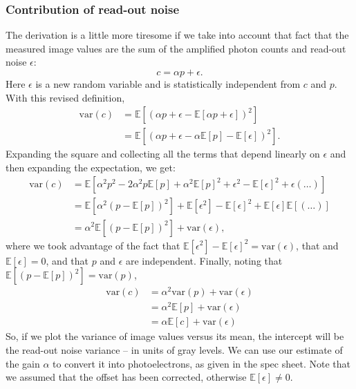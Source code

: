 \documentclass[a4paper]{report}
\begin{document}
\subsubsection{Contribution of read-out noise}
The derivation is a little more tiresome if we take into account that fact that the measured image values are the sum of the amplified photon counts and read-out noise $\epsilon$:
\begin{equation}
	c = \alpha p + \epsilon.
\end{equation}
Here $\epsilon$ is a new random variable and is statistically independent from $c$ and $p$. With this revised definition, 
\begin{align}
	\mathrm{var}(c) & = \mathbb{E}[(\alpha p + \epsilon - \mathbb{E}[\alpha p + \epsilon ])^2] \\
	& = \mathbb{E}[(\alpha p + \epsilon - \alpha \mathbb{E}[p] - \mathbb{E}[\epsilon])^2].
\end{align}
Expanding the square and collecting all the terms that depend linearly on $\epsilon$ and then expanding the expectation, we get:
\begin{align}
	\mathrm{var}(c) & = \mathbb{E}[\alpha^2 p^2 - 2\alpha^2 p\mathbb{E}[p] +\alpha^2\mathbb{E}[p]^2 + \epsilon^2 - \mathbb{E}[\epsilon]^2 + \epsilon(\ldots)]\\
	& =  \mathbb{E}[\alpha^2(p - \mathbb{E}[p])^2] + \mathbb{E}[\epsilon^2] - \mathbb{E}[\epsilon]^2 + \mathbb{E}[\epsilon]\mathbb{E}[(\ldots)] \\
	& = \alpha^2 \mathbb{E}[(p - \mathbb{E}[p])^2] + \mathrm{var}(\epsilon),
\end{align}
where we took advantage of the fact that $\mathbb{E}[\epsilon^2] - \mathbb{E}[\epsilon]^2 = \mathrm{var}(\epsilon)$, that and $\mathbb{E}[\epsilon]=0$, and that $p$ and $\epsilon$ are independent. Finally, noting that $\mathbb{E}[(p - \mathbb{E}[p])^2] = \mathrm{var}(p)$,
\begin{align}
	\mathrm{var}(c) & = \alpha^2 \mathrm{var}(p) + \mathrm{var}(\epsilon) \\
	& = \alpha^2 \mathbb{E}[p] + \mathrm{var}(\epsilon) \\
	& = \alpha\mathbb{E}[c] + \mathrm{var}(\epsilon)
\end{align}
So, if we plot the variance of image values versus its mean, the intercept will be the read-out noise variance -- in units of gray levels. We can use our estimate of the gain $\alpha$ to convert it into photoelectrons, as given in the spec sheet. Note that we assumed that the offset has been corrected, otherwise $\mathbb{E}[\epsilon] \neq 0$.
\end{document}
